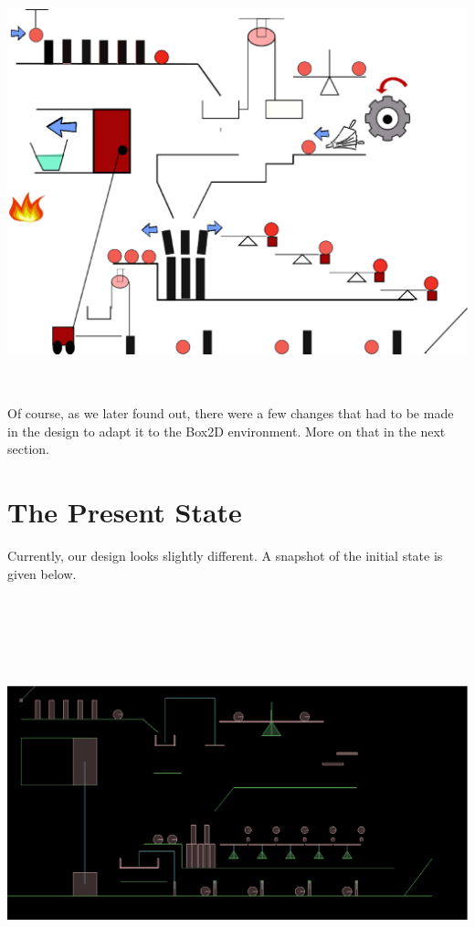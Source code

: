 \documentclass[a4paper,11pt]{article}
\begin{document}
\begin{center}
\includegraphics[width=180mm, height=120mm]{RubeGoldberg.eps}\\
\label{Fig. : Original Proposed Design of Rube Goldberg}
\end{center}

Of course, as we later found out, there were a few changes that had to be made in the design to adapt it to the Box2D environment. More on that in the next section.

\section{The Present State}

Currently, our design looks slightly different. A snapshot of the initial state is given below.

\begin{center}
\includegraphics[width=160mm, height=120mm]{state_00.eps}\\
\label{Fig. : State of Machine before Start}
\end{center}
\end{document}
